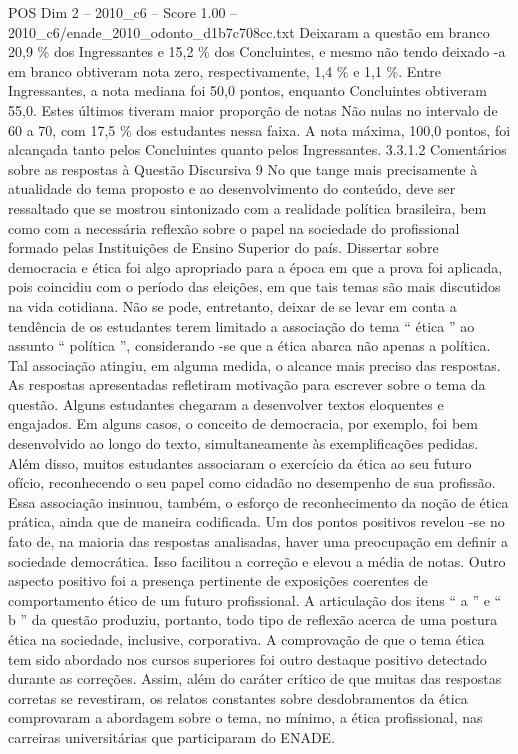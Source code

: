 \begin{textsample}{POS Dim 2 – 2010\_c6 – Score 1.00 – 2010\_c6/enade\_2010\_odonto\_d1b7c708cc.txt}
Deixaram a questão em branco 20,9 \% dos Ingressantes e 15,2 \% dos Concluintes, e mesmo não tendo deixado -a em branco obtiveram nota zero, respectivamente, 1,4 \% e 1,1 \%.
Entre Ingressantes, a nota mediana foi 50,0 pontos, enquanto Concluintes obtiveram 55,0.
Estes últimos tiveram maior proporção de notas Não nulas no intervalo de 60 a 70, com 17,5 \% dos estudantes nessa faixa.
A nota máxima, 100,0 pontos, foi alcançada tanto pelos Concluintes quanto pelos Ingressantes. 3.3.1.2 Comentários sobre as respostas à Questão Discursiva 9 No que tange mais precisamente à atualidade do tema proposto e ao desenvolvimento do conteúdo, deve ser ressaltado que se mostrou sintonizado com a realidade política brasileira, bem como com a necessária reflexão sobre o papel na sociedade do profissional formado pelas Instituições de Ensino Superior do país.
Dissertar sobre democracia e ética foi algo apropriado para a época em que a prova foi aplicada, pois coincidiu com o período das eleições, em que tais temas são mais discutidos na vida cotidiana.
Não se pode, entretanto, deixar de se levar em conta a tendência de os estudantes terem limitado a associação do tema “ ética ” ao assunto “ política ”, considerando -se que a ética abarca não apenas a política.
Tal associação atingiu, em alguma medida, o alcance mais preciso das respostas.
As respostas apresentadas refletiram motivação para escrever sobre o tema da questão.
Alguns estudantes chegaram a desenvolver textos eloquentes e engajados.
Em alguns casos, o conceito de democracia, por exemplo, foi bem desenvolvido ao longo do texto, simultaneamente às exemplificações pedidas.
Além disso, muitos estudantes associaram o exercício da ética ao seu futuro ofício, reconhecendo o seu papel como cidadão no desempenho de sua profissão.
Essa associação insinuou, também, o esforço de reconhecimento da noção de ética prática, ainda que de maneira codificada.
Um dos pontos positivos revelou -se no fato de, na maioria das respostas analisadas, haver uma preocupação em definir a sociedade democrática.
Isso facilitou a correção e elevou a média de notas.
Outro aspecto positivo foi a presença pertinente de exposições coerentes de comportamento ético de um futuro profissional.
A articulação dos itens “ a ” e “ b ” da questão produziu, portanto, todo tipo de reflexão acerca de uma postura ética na sociedade, inclusive, corporativa.
A comprovação de que o tema ética tem sido abordado nos cursos superiores foi outro destaque positivo detectado durante as correções.
Assim, além do caráter crítico de que muitas das respostas corretas se revestiram, os relatos constantes sobre desdobramentos da ética comprovaram a abordagem sobre o tema, no mínimo, a ética profissional, nas carreiras universitárias que participaram do ENADE.

\end{textsample}
